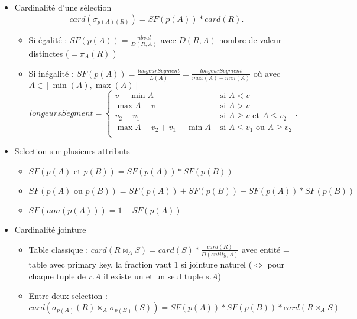 \documentclass{article}
\theoremstyle{plain}%
\theoremstyle{definition}
\theoremstyle{remark}
\begin{document}
\begin{itemize}
    \item Cardinalité d'une sélection 
    \[
        card(\sigma _{p(A) (R)}) = SF(p(A)) * card(R)
    .\]
    \begin{itemize}
        \item Si égalité : $ SF(p(A)) = \frac{nbval}{D(R,A)} $ avec $ D(R,A) $ nombre de valeur distinctes ($ = \pi _A (R)$ )
        \item Si inégalité : $ SF(p(A)) = \frac{longeurSegment}{L(A)} = \frac{longeurSegment}{max(A) - min(A)}$ où avec $ A \in [\min (A), \max (A)] $ 
        \[
            longeursSegment = \begin{cases}
                v - \min A &\text{ si } A < v\\
                \max A - v &\text{ si } A > v\\
                v_2 - v_1 &\text{ si } A \geq v \text{ et } A \leq v_2 \\
                \max A - v_2 + v_1 - \min A &\text{ si } A \leq v_1 \text{ ou } A \geq v_2 \\
                \end{cases}  
        .\]
    \end{itemize}
    \item Selection sur plusieurs attributs \begin{itemize}
        \item $ SF(p(A) \text{ et } p(B)) = SF(p(A)) * SF(p(B)) $ 
        \item $ SF(p(A) \text{ ou } p(B)) = SF(p(A)) + SF(p(B)) - SF(p(A)) * SF(p(B)) $
        \item $ SF(non(p(A))) = 1 - SF(p(A)) $ 
    \end{itemize}
    \item Cardinalité jointure \begin{itemize}
        \item Table classique : $ card(R \bowtie_A S) = card(S)* \frac{card(R)}{D(entity, A)} $ avec entité = table avec primary key, la fraction vaut $ 1 $ si jointure naturel ($ \Leftrightarrow $ pour chaque tuple de $ r.A $ il existe un et un seul tuple $ s.A $)
        \item Entre deux selection : $ card(\sigma _{p(A)} (R) \bowtie _A \sigma _{p(B)} (S)) = SF(p(A)) * SF(p(B)) * card(R \bowtie _A S) $ 
    \end{itemize}
\end{itemize}
\end{document}
